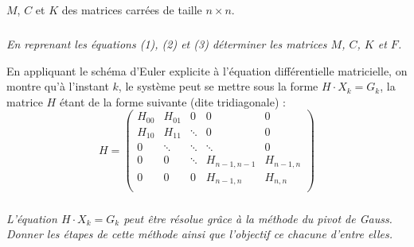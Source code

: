 \documentclass[10pt]{article}
\newif\ifprof
\begin{document}
$M$, $C$ et $K$ des matrices carrées de taille $n\times n$.


\subparagraph{}
\textit{En reprenant les équations (1), (2) et (3) déterminer les matrices $M$, $C$, $K$ et $F$.}
\ifprof
\begin{corrige}
\footnotesize{
$$
M =
\begin{pmatrix}
m  &  0 & 0 \\
0  & \ddots &0 \\
0 & 0 &  m \\
 \end{pmatrix}
 \quad
C =
\begin{pmatrix}
2c  & -c &  0 & \cdots & \cdots & \cdots  & 0 \\
-c  & 2c & -c & \ddots &  & 0& \vdots\\
0 & -c  & 2c & \ddots & \ddots &  & \vdots\\
\vdots & \ddots &\ddots & \ddots & \ddots & \ddots & \vdots\\
\vdots &  & \ddots &\ddots& 2c & -c & 0 \\
\vdots & 0 &  & \ddots & -c & 2c & -c\\
0 & \cdots & \cdots & \cdots & 0 & -c & 2c\\
 \end{pmatrix}
 \quad
K =
\begin{pmatrix}
2k  & -k &  0 & \cdots & \cdots & \cdots  & 0 \\
-k & 2k & -k & \ddots &  & 0& \vdots\\
0 & -k  & 2k & \ddots & \ddots &  & \vdots\\
\vdots & \ddots &\ddots & \ddots & \ddots & \ddots & \vdots\\
\vdots &  & \ddots &\ddots& 2k & -k & 0 \\
\vdots & 0 &  & \ddots & -k & 2k & -k\\
0 & \cdots & \cdots & \cdots & 0 & -k & 2k\\
 \end{pmatrix}
 \quad
 F =
 \begin{pmatrix}
 0 \\
 \vdots \\
 0 \\
 f_n(t) 
 \end{pmatrix}
$$}
\end{corrige}
\else
\fi


En appliquant le schéma d'Euler explicite à l'équation différentielle matricielle, on montre qu'à l'instant $k$, le système peut se mettre sous la forme $H\cdot X_k = G_k$, la matrice $H$ étant de la forme suivante (dite tridiagonale) :
$$
H =
\begin{pmatrix}
H_{00}  & H_{01} &  0 & 0 & 0 \\
H_{10}  & H_{11} &  \ddots & 0 & 0 \\
0 & \ddots & \ddots & \ddots & 0 \\
0 & 0 & \ddots & H_{n-1,n-1} & H_{n-1,n} \\
0 & 0 & 0 & H_{n-1,n} & H_{n,n} \\
\end{pmatrix}
 $$


\subparagraph{}
\textit{L'équation  $H\cdot X_k = G_k$ peut être résolue grâce à la méthode du pivot de Gauss. Donner les étapes de cette méthode ainsi que l'objectif ce chacune d'entre elles. }
\ifprof
\begin{corrige}
\end{corrige}
\else
\fi
\end{document}
